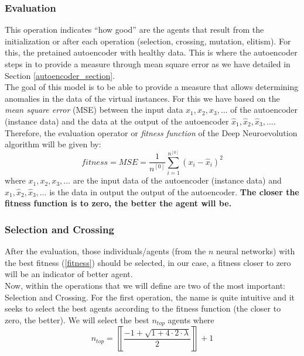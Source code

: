 \documentclass{iosart2c}
\begin{document}
\subsubsection{Evaluation}\label{evaluacion}

This operation indicates ``how good'' are the agents that result from the initialization or after each operation (selection, crossing, mutation, elitism). For this, the pretained autoencoder with healthy data. This is where the autoencoder steps in to provide a measure through mean square error as we have detailed in Section \ref{autoencoder_section}.\\

The goal of this model is to be able to provide a measure that allows determining anomalies in the data of the virtual instances. For this we have based on the \textit{mean square error} (MSE) between the input data ${x_1,x_2,x_3,\ldots}$ of the autoencoder (instance data) and the data at the output of the autoencoder ${\hat{x}_1,\hat{x}_2,\hat{x}_3,\ldots}$. \\

Therefore, the evaluation operator or \textit{fitness function} of the Deep Neuroevolution algorithm will be given by: \\
\begin{equation}\label{fitness}
    fitness=MSE=\frac{1}{n^{[0]}}\sum_{i=1}^{n^{[0]}} (x_i-\hat{x}_i)^2
\end{equation}
where ${x_1,x_2,x_3,\ldots}$ are the input data of the autoencoder (instance data) and ${\hat{x}_1,\hat{x}_2,\hat{x}_3,\ldots}$ is the data in output the output of the autoencoder. \textbf{The closer the fitness function is to zero, the better the agent will be.} \\



\subsubsection{Selection and Crossing}

After the evaluation, those individuals/agents (from the $n$ neural networks) with the best fitness (\ref{fitness}) should be selected, in our case, a fitness closer to zero will be an indicator of better agent. \\

Now, within the operations that we will define are two of the most important: Selection and Crossing. For the first operation, the name is quite intuitive and it seeks to select the best agents according to the fitness function (the closer to zero, the better). We will select the best $n_{top}$ agents where
\begin{equation}\label{n_top}
    n_{top}=\left\llbracket\frac{-1+\sqrt{1+4\cdot2\cdot \lambda}}{2}\right\rrbracket+1
\end{equation}
\end{document}
